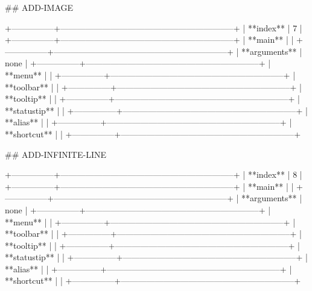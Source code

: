 ## ADD-IMAGE

+---------------+--------------------------------------------------------------+
| **index**     | 7                                                            |
+---------------+--------------------------------------------------------------+
| **main**      |                                                              |
+---------------+--------------------------------------------------------------+
| **arguments** | none                                                         |
+---------------+--------------------------------------------------------------+
| **menu**      |                                                              |
+---------------+--------------------------------------------------------------+
| **toolbar**   |                                                              |
+---------------+--------------------------------------------------------------+
| **tooltip**   |                                                              |
+---------------+--------------------------------------------------------------+
| **statustip** |                                                              |
+---------------+--------------------------------------------------------------+
| **alias**     |                                                              |
+---------------+--------------------------------------------------------------+
| **shortcut**  |                                                              |
+---------------+--------------------------------------------------------------+

## ADD-INFINITE-LINE

+---------------+--------------------------------------------------------------+
| **index**     | 8                                                            |
+---------------+--------------------------------------------------------------+
| **main**      |                                                              |
+---------------+--------------------------------------------------------------+
| **arguments** | none                                                         |
+---------------+--------------------------------------------------------------+
| **menu**      |                                                              |
+---------------+--------------------------------------------------------------+
| **toolbar**   |                                                              |
+---------------+--------------------------------------------------------------+
| **tooltip**   |                                                              |
+---------------+--------------------------------------------------------------+
| **statustip** |                                                              |
+---------------+--------------------------------------------------------------+
| **alias**     |                                                              |
+---------------+--------------------------------------------------------------+
| **shortcut**  |                                                              |
+---------------+--------------------------------------------------------------+


